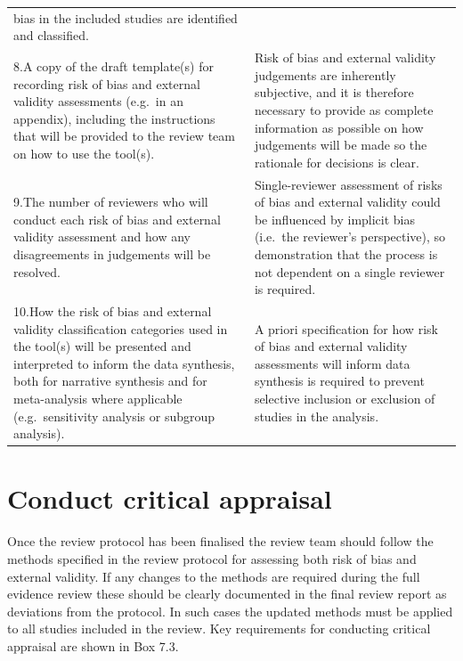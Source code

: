 \documentclass[
  letterpaper,
  DIV=11,
  numbers=noendperiod]{scrreprt}
\begin{document}
{\begin{longtable}[]{@{}
  >{\raggedright\arraybackslash}p{}
  >{\raggedright\arraybackslash}p{}@{}}
\begin{minipage}[t]{\linewidth}
bias in the included studies are identified and classified.\strut
\end{minipage} \\
8.A copy of the draft template(s) for recording risk of bias and
external validity assessments (e.g.~in an appendix), including the
instructions that will be provided to the review team on how to use the
tool(s). & Risk of bias and external validity judgements are inherently
subjective, and it is therefore necessary to provide as complete
information as possible on how judgements will be made so the rationale
for decisions is clear. \\
9.The number of reviewers who will conduct each risk of bias and
external validity assessment and how any disagreements in judgements
will be resolved. & Single-reviewer assessment of risks of bias and
external validity could be influenced by implicit bias (i.e.~the
reviewer's perspective), so demonstration that the process is not
dependent on a single reviewer is required. \\
10.How the risk of bias and external validity classification categories
used in the tool(s) will be presented and interpreted to inform the data
synthesis, both for narrative synthesis and for meta-analysis where
applicable (e.g.~sensitivity analysis or subgroup analysis). & A priori
specification for how risk of bias and external validity assessments
will inform data synthesis is required to prevent selective inclusion or
exclusion of studies in the analysis. \\
\end{longtable}
}

\section{Conduct critical appraisal}\label{conduct-critical-appraisal}

Once the review protocol has been finalised the review team should
follow the methods specified in the review protocol for assessing both
risk of bias and external validity. If any changes to the methods are
required during the full evidence review these should be clearly
documented in the final review report as deviations from the protocol.
In such cases the updated methods must be applied to all studies
included in the review. Key requirements for conducting critical
appraisal are shown in Box 7.3.
\end{document}
